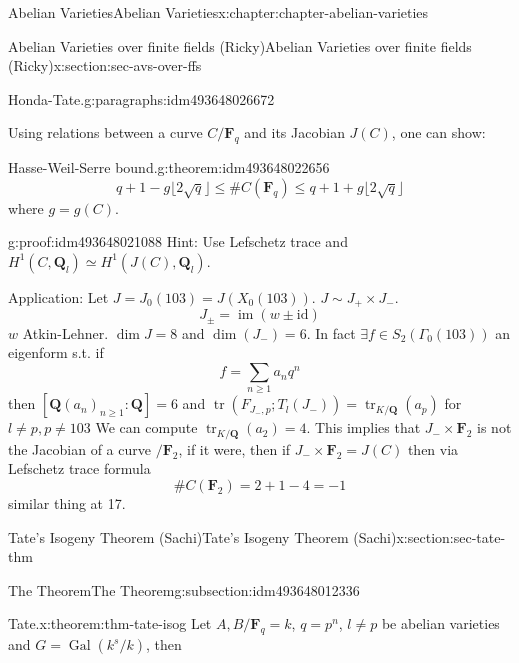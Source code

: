 \documentclass[oneside,10pt,]{book}
\numberwithin{equation}{section}
\newcommand{\lb}{[}
\newcommand{\rb}{]}
\newcommand{\QQ}{\mathbf{Q}}
\newcommand{\FF}{\mathbf{F}}
\newcommand{\id}{\mathrm{id}}
\DeclareMathOperator{\im}{im}
\DeclareMathOperator{\tr}{tr}
\newcommand{\Gal}[2]{\operatorname{Gal}(#1/#2)}
\begin{document}
\begin{chapterptx}{Abelian Varieties}{}{Abelian Varieties}{}{}{x:chapter:chapter-abelian-varieties}
\begin{sectionptx}{Abelian Varieties over finite fields (Ricky)}{}{Abelian Varieties over finite fields (Ricky)}{}{}{x:section:sec-avs-over-ffs}
\begin{paragraphs}{Honda-Tate.}{g:paragraphs:idm493648026672}
\end{paragraphs}%
\par
Using relations between a curve \(C/\FF_q\) and its Jacobian \(J(C) \), one can show:%
\begin{theorem}{Hasse-Weil-Serre bound.}{}{g:theorem:idm493648022656}%
%
\begin{equation*}
q + 1 - g\lfloor 2\sqrt q\rfloor \le \#C(\FF_{q}) \le q + 1 + g\lfloor 2\sqrt q\rfloor
\end{equation*}
where \(g=  g(C)\).%
\end{theorem}
\begin{proofptx}{}{g:proof:idm493648021088}
Hint: Use Lefschetz trace and \(H^1(C, \QQ_l) \simeq H^1(J(C) , \QQ_l)\).%
\end{proofptx}
Application: Let \(J = J_0(103) = J(X_0(103))\). \(J\sim J_+ \times J_-\).%
\begin{equation*}
J_{\pm} = \im(w \pm \id)
\end{equation*}
\(w\) Atkin-Lehner. \(\dim J = 8\) and \(\dim(J_-) = 6\). In fact \(\exists f\in  S_2( \Gamma_0(103))\) an eigenform s.t. if%
\begin{equation*}
f=\sum_{n\ge 1} a_n q^n
\end{equation*}
then \(\lb \QQ(a_n)_{n \ge 1}: \QQ\rb =6\) and \(\tr( F_{J_-,p};  T_l(J_-)) = \tr_{K/\QQ}(a_p)\)  for \(l \ne p, p\ne 103\) We can compute \(\tr_{K/\QQ} ( a_2) = 4\). This implies that \(J_- \times \FF_2\) is not the Jacobian of a curve \(/\FF_2\), if it were, then  if \(J_- \times \FF_2 = J(C)\) then via Lefschetz trace formula%
\begin{equation*}
\#C(\FF_2) = 2+1 - 4 = -1
\end{equation*}
similar thing at 17.%
\end{sectionptx}
%
%
\typeout{************************************************}
\typeout{************************************************}
%
\begin{sectionptx}{Tate's Isogeny Theorem (Sachi)}{}{Tate's Isogeny Theorem (Sachi)}{}{}{x:section:sec-tate-thm}
%
%
\typeout{************************************************}
\typeout{************************************************}
%
\begin{subsectionptx}{The Theorem}{}{The Theorem}{}{}{g:subsection:idm493648012336}
\begin{theorem}{Tate.}{}{x:theorem:thm-tate-isog}%
Let \(A,B/\FF_q = k\), \(q = p^n\), \(l\ne p\) be abelian varieties and \(G = \Gal{k^s}{k}\), then%

\end{theorem}
\end{subsectionptx}
\end{sectionptx}
\end{chapterptx}
\end{document}

